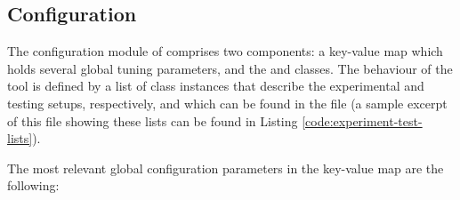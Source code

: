 \subsection{Configuration}\label{sec:framework-config} 

The configuration module of \toolname{} comprises two components: a key-value map which holds several global tuning parameters, and the  and  classes. The behaviour of the tool is defined by a list of class instances that describe the experimental and testing setups, respectively, and which can be found in the  file (a sample excerpt of this file showing these lists can be found in Listing \ref{code:experiment-test-lists}).

The most relevant global configuration parameters in the key-value map are the following:

